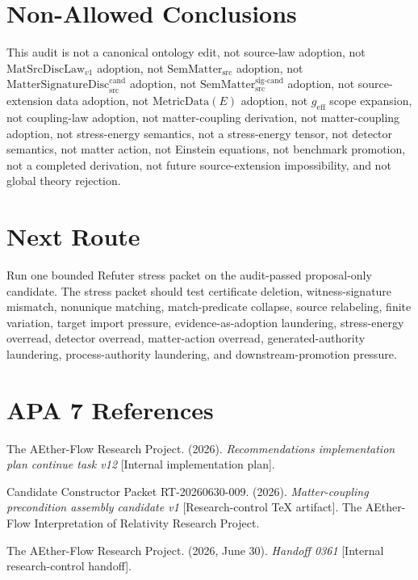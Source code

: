 \documentclass[11pt]{article}
\newcommand{\MetricData}{\mathrm{MetricData}}
\newcommand{\geff}{g_{\mathrm{eff}}}
\newcommand{\MatSrcDiscLaw}{\mathrm{MatSrcDiscLaw}_{v1}}
\newcommand{\SemMatterSrc}{\mathrm{SemMatter}_{\mathrm{src}}}
\newcommand{\SemMatterSig}{\mathrm{SemMatter}_{\mathrm{src}}^{\mathrm{sig\text{-}cand}}}
\newcommand{\MatSigDisc}{\mathrm{MatterSignatureDisc}_{\mathrm{src}}^{\mathrm{cand}}}
\begin{document}
\section{Non-Allowed Conclusions}

This audit is not a canonical ontology edit, not source-law adoption, not
\(\MatSrcDiscLaw\) adoption, not \(\SemMatterSrc\) adoption, not
\(\MatSigDisc\) adoption, not \(\SemMatterSig\) adoption, not source-extension
data adoption, not \(\MetricData(E)\) adoption, not \(\geff\) scope expansion,
not coupling-law adoption, not matter-coupling derivation, not
matter-coupling adoption, not stress-energy semantics, not a stress-energy
tensor, not detector semantics, not matter action, not Einstein equations,
not benchmark promotion, not a completed derivation, not future
source-extension impossibility, and not global theory rejection.

\section{Next Route}

Run one bounded Refuter stress packet on the audit-passed proposal-only
candidate. The stress packet should test certificate deletion,
witness-signature mismatch, nonunique matching, match-predicate collapse,
source relabeling, finite variation, target import pressure,
evidence-as-adoption laundering, stress-energy overread, detector overread,
matter-action overread, generated-authority laundering, process-authority
laundering, and downstream-promotion pressure.

\section{APA 7 References}

The AEther-Flow Research Project. (2026). \emph{Recommendations
implementation plan continue task v12} [Internal implementation plan].

Candidate Constructor Packet RT-20260630-009. (2026).
\emph{Matter-coupling precondition assembly candidate v1}
[Research-control TeX artifact]. The AEther-Flow Interpretation of Relativity
Research Project.

The AEther-Flow Research Project. (2026, June 30). \emph{Handoff 0361}
[Internal research-control handoff].
\end{document}
